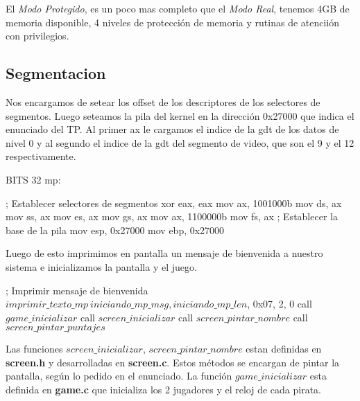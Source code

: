El \textit{Modo Protegido}, es un poco mas completo que el \textit{Modo Real}, tenemos 4GB de memoria disponible, 4 niveles de protecci\'on de memoria y rutinas de atencii\'on con privilegios.

\subsection{Segmentacion}
Nos encargamos de setear los offset de los descriptores de los selectores de segmentos. Luego seteamos la pila del kernel en la direcci\'on 0x27000 que indica el enunciado del TP. Al primer ax le cargamos el indice de la gdt de los datos de nivel 0 y al segundo el indice de la gdt del segmento de video, que son el 9 y el 12 respectivamente.

\begin{algorithmic}
\State \tab BITS 32
\State \tab mp:

    \State \tab \tab ; Establecer selectores de segmentos
    \State \tab \tab xor eax, eax
    \State \tab \tab  mov ax, 1001000b
    \State \tab \tab  mov ds, ax
    \State \tab \tab  mov ss, ax
    \State \tab \tab  mov es, ax
    \State \tab \tab  mov gs, ax
    \State \tab \tab  mov ax, 1100000b
    \State \tab \tab  mov fs, ax
    \State \tab \tab  ; Establecer la base de la pila
    \State \tab \tab  mov esp, 0x27000
    \State \tab \tab  mov ebp, 0x27000
\end{algorithmic}

Luego de esto imprimimos en pantalla un mensaje de bienvenida a nuestro sistema e inicializamos la pantalla y el juego.
\begin{algorithmic}
    \State \tab \tab ; Imprimir mensaje de bienvenida
    \State \tab \tab $imprimir\_texto\_mp \ iniciando\_mp\_msg, iniciando\_mp\_len$, 0x07, 2, 0
    \State \tab \tab call $game\_inicializar$
    \State \tab \tab call $screen\_inicializar$
    \State \tab \tab call $screen\_pintar\_nombre$
    \State \tab \tab call $screen\_pintar\_puntajes$
\end{algorithmic}

Las funciones \textit{$screen\_inicializar$}, \textit{$screen\_pintar\_nombre$} estan definidas en \textbf{screen.h} y desarrolladas en \textbf{screen.c}. Estos m\'etodos se encargan de pintar la pantalla, seg\'un lo pedido en el enunciado. La función \textit{$game\_inicializar$} esta definida en \textbf{game.c} que inicializa los 2 jugadores y el reloj de cada pirata.


